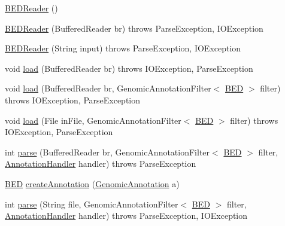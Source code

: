 \begin{DoxyCompactItemize}
\item 
\hyperlink{classbroad_1_1core_1_1annotation_1_1_b_e_d_reader_a1382a526e623d9df51962ce2621372fa}{B\+E\+D\+Reader} ()
\item 
\hyperlink{classbroad_1_1core_1_1annotation_1_1_b_e_d_reader_af8db3394584fc6f2cd4126c4be680155}{B\+E\+D\+Reader} (Buffered\+Reader br)  throws Parse\+Exception, I\+O\+Exception 
\item 
\hyperlink{classbroad_1_1core_1_1annotation_1_1_b_e_d_reader_a371557fe2555905fae9d23bd491cf9fb}{B\+E\+D\+Reader} (String input)  throws Parse\+Exception, I\+O\+Exception 
\item 
void \hyperlink{classbroad_1_1core_1_1annotation_1_1_b_e_d_reader_aa65d86cf3a72d39717335c3e44f6555a}{load} (Buffered\+Reader br)  throws I\+O\+Exception, Parse\+Exception 
\item 
void \hyperlink{classbroad_1_1core_1_1annotation_1_1_b_e_d_reader_aa3d40d6058ff90cb0567cb9cfecb446c}{load} (Buffered\+Reader br, Genomic\+Annotation\+Filter$<$ \hyperlink{classbroad_1_1core_1_1annotation_1_1_b_e_d}{B\+E\+D} $>$ filter)  throws I\+O\+Exception, Parse\+Exception 
\item 
void \hyperlink{classbroad_1_1core_1_1annotation_1_1_b_e_d_reader_ad25e185e78a2e2a3a9655a7651bf0f60}{load} (File in\+File, Genomic\+Annotation\+Filter$<$ \hyperlink{classbroad_1_1core_1_1annotation_1_1_b_e_d}{B\+E\+D} $>$ filter)  throws I\+O\+Exception, Parse\+Exception 
\item 
int \hyperlink{classbroad_1_1core_1_1annotation_1_1_b_e_d_reader_ac8efb1d81ce6d15e05f99d68f6cdfbab}{parse} (Buffered\+Reader br, Genomic\+Annotation\+Filter$<$ \hyperlink{classbroad_1_1core_1_1annotation_1_1_b_e_d}{B\+E\+D} $>$ filter, \hyperlink{interfacebroad_1_1core_1_1annotation_1_1_annotation_handler}{Annotation\+Handler} handler)  throws Parse\+Exception 
\item 
\hyperlink{classbroad_1_1core_1_1annotation_1_1_b_e_d}{B\+E\+D} \hyperlink{classbroad_1_1core_1_1annotation_1_1_b_e_d_reader_a65cd4de10f0de6ff4441c1ebce59f0d0}{create\+Annotation} (\hyperlink{interfacebroad_1_1core_1_1annotation_1_1_genomic_annotation}{Genomic\+Annotation} a)
\item 
int \hyperlink{classbroad_1_1core_1_1annotation_1_1_b_e_d_reader_a433644553c38506ff0a28a09929da917}{parse} (String file, Genomic\+Annotation\+Filter$<$ \hyperlink{classbroad_1_1core_1_1annotation_1_1_b_e_d}{B\+E\+D} $>$ filter, \hyperlink{interfacebroad_1_1core_1_1annotation_1_1_annotation_handler}{Annotation\+Handler} handler)  throws Parse\+Exception, I\+O\+Exception 
\end{DoxyCompactItemize}


